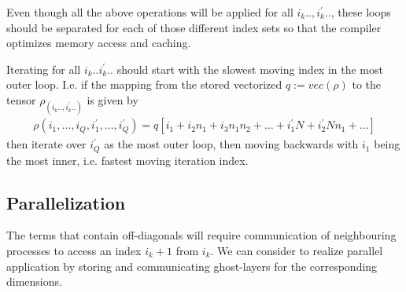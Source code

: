 \documentclass[letterpaper]{article}
\begin{document}
  Even though all the above operations will be applied for all $i_k.., i_k^\prime..$, these loops should be separated for each of those different index sets so that the compiler optimizes memory access and caching.

  Iterating for all $i_k..i_k^\prime..$ should start with the slowest moving index in the most outer loop. I.e. if the mapping from the stored vectorized $q := vec(\rho)$ to the tensor $\rho_(i_k..,i_k^\prime..)$ is given by
    \begin{align}
        \rho(i_1,\dots,i_Q,i_1^\prime,\dots,i_Q^\prime) = q[i_1 + i_2n_1 + i_3n_1n_2 + \dots + i_1^\prime N + i_2^\prime Nn_1 + \dots]
    \end{align}
  then iterate over $i_Q^\prime$ as the most outer loop, then moving backwards with $i_1$ being the most inner, i.e. fastest moving iteration index.

 \subsection{Parallelization} 
 The terms that contain off-diagonals will require communication of neighbouring processes to access an index $i_k+1$ from $i_k$. We can consider to realize parallel application by storing and communicating ghost-layers for the corresponding dimensions. 
\end{document}
